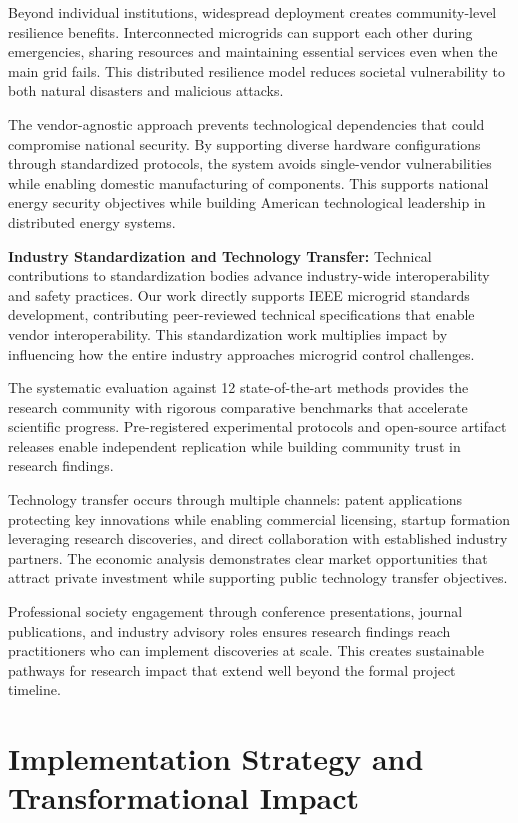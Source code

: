 \documentclass[12pt]{article}
\begin{document}
Beyond individual institutions, widespread deployment creates community-level resilience benefits. Interconnected microgrids can support each other during emergencies, sharing resources and maintaining essential services even when the main grid fails. This distributed resilience model reduces societal vulnerability to both natural disasters and malicious attacks.

The vendor-agnostic approach prevents technological dependencies that could compromise national security. By supporting diverse hardware configurations through standardized protocols, the system avoids single-vendor vulnerabilities while enabling domestic manufacturing of components. This supports national energy security objectives while building American technological leadership in distributed energy systems.

\textbf{Industry Standardization and Technology Transfer:} Technical contributions to standardization bodies advance industry-wide interoperability and safety practices. Our work directly supports IEEE microgrid standards development, contributing peer-reviewed technical specifications that enable vendor interoperability. This standardization work multiplies impact by influencing how the entire industry approaches microgrid control challenges.

The systematic evaluation against 12 state-of-the-art methods \cite{our2024comparative} provides the research community with rigorous comparative benchmarks that accelerate scientific progress. Pre-registered experimental protocols and open-source artifact releases enable independent replication while building community trust in research findings.

Technology transfer occurs through multiple channels: patent applications protecting key innovations while enabling commercial licensing, startup formation leveraging research discoveries, and direct collaboration with established industry partners. The economic analysis demonstrates clear market opportunities that attract private investment while supporting public technology transfer objectives.

Professional society engagement through conference presentations, journal publications, and industry advisory roles ensures research findings reach practitioners who can implement discoveries at scale. This creates sustainable pathways for research impact that extend well beyond the formal project timeline.

\section{Implementation Strategy and Transformational Impact}
\end{document}

